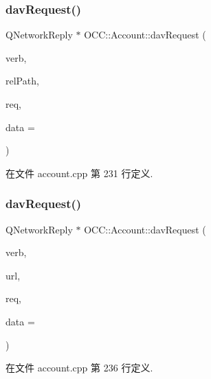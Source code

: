 \subsubsection{\texorpdfstring{dav\+Request()}{davRequest()}\hspace{0.1cm}{\footnotesize\ttfamily [1/2]}}
{\footnotesize\ttfamily Q\+Network\+Reply $\ast$ O\+C\+C\+::\+Account\+::dav\+Request (\begin{DoxyParamCaption}\item[{const Q\+Byte\+Array \&}]{verb,  }\item[{const Q\+String \&}]{rel\+Path,  }\item[{Q\+Network\+Request}]{req,  }\item[{Q\+I\+O\+Device $\ast$}]{data = {} }\end{DoxyParamCaption})}



在文件 account.\+cpp 第 231 行定义.

\mbox{\label{class_o_c_c_1_1_account_a8a1446779c4118c988420a66790aa569}} 
\subsubsection{\texorpdfstring{dav\+Request()}{davRequest()}\hspace{0.1cm}{\footnotesize\ttfamily [2/2]}}
{\footnotesize\ttfamily Q\+Network\+Reply $\ast$ O\+C\+C\+::\+Account\+::dav\+Request (\begin{DoxyParamCaption}\item[{const Q\+Byte\+Array \&}]{verb,  }\item[{const Q\+Url \&}]{url,  }\item[{Q\+Network\+Request}]{req,  }\item[{Q\+I\+O\+Device $\ast$}]{data = {} }\end{DoxyParamCaption})}



在文件 account.\+cpp 第 236 行定义.

\mbox{\label{class_o_c_c_1_1_account_a3e72ac7ea67c0029080f31672efe1b88}} 
